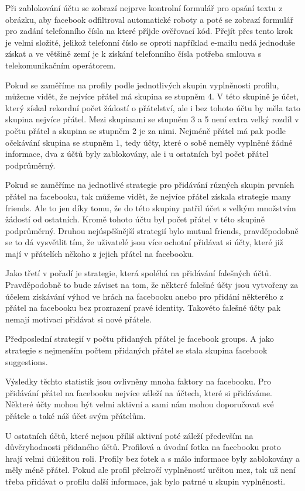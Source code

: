 \documentclass[thesis=M,czech]{FITthesis}[2013/05/10]
\begin{document}
Při zablokování účtu se zobrazí nejprve kontrolní formulář pro opsání textu z obrázku, aby facebook odfiltroval automatické roboty a poté se zobrazí formulář pro zadání telefonního čísla na které příjde ověřovací kód. Přejít přes tento krok je velmi složité, jelikož telefonní číslo se oproti například e-mailu nedá jednoduše získat a ve většině zemí je k získání telefonního čísla potřeba smlouva s telekomunikačním operátorem.


Pokud se zaměříme na profily podle jednotlivých skupin vyplněnosti profilu, můžeme vidět, že nejvíce přátel má skupina se stupněm 4. V této skupině je účet, který získal rekordní počet žádostí o přátelství, ale i bez tohoto účtu by měla tato skupina nejvíce přátel. Mezi skupinami se stupněm 3 a 5 není extra velký rozdíl v počtu přátel a skupina se stupněm 2 je za nimi. Nejméně přátel má pak podle očekávání skupina se stupněm 1, tedy účty, které o sobě neměly vyplněné žádné informace, dva z účtů byly zablokovány, ale i u ostatních byl počet přátel podprůměrný.


Pokud se zaměříme na jednotlivé strategie pro přidávání různých skupin prvních přátel na facebooku, tak můžeme vidět, že nejvíce přátel získala strategie many friends. Ale to jen díky tomu, že do této skupiny patřil účet s velkým množstvím žádostí od ostatních. Kromě tohoto účtu byl počet přátel v této skupině podprůměrný. Druhou nejúspěšnější strategií bylo mutual friends, pravděpodobně se to dá vysvětlit tím, že uživatelé jsou více ochotní přidávat si účty, které již mají v přátelích někoho z jejich přátel na facebooku.

Jako třetí v pořadí je strategie, která spoléhá na přidávání falešných účtů. Pravděpodobně to bude záviset na tom, že některé falešné účty jsou vytvořeny za účelem získávání výhod ve hrách na facebooku anebo pro přidání některého z přátel na facebooku bez prozrazení pravé identity. Takovéto falešné účty pak nemají motivaci přidávat si nové přátele.

Předposlední strategií v počtu přidaných přátel je facebook groups. A jako strategie s nejmenším počtem přidaných přátel se stala skupina facebook suggestions. 

Výsledky těchto statistik jsou ovlivněny mnoha faktory na facebooku. Pro přidávání přátel na facebooku nejvíce záleží na účtech, které si přidáváme. Některé účty mohou být velmi aktivní a sami nám mohou doporučovat své přátele a také náš účet svým přátelům. 

U ostatních účtů, které nejsou příliš aktivní poté záleží především na důvěryhodnosti přidaného účtů. Profilová a úvodní fotka na facebooku proto hrají velmi důležitou roli. Profily bez fotek a s málo informace byly zablokovány a měly méně přátel. Pokud ale profil překročí vyplněností určitou mez, tak už není třeba přidávat o profilu další informace, jak bylo patrné u skupin vyplněnosti.
\end{document}
